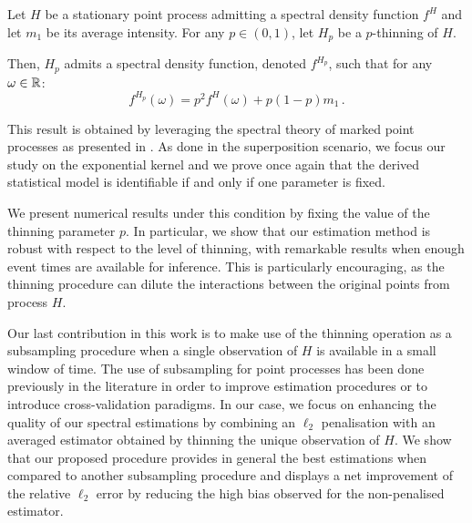     \begin{proposition}\label{prop:chap0_spectral_thinning}
      Let $H$ be a stationary point process admitting a spectral density function $f^H$ and let $m_1$ be its average intensity.
      For any $p\in(0,1)$, let $H_p$ be a $p$-thinning of $H$.
  
      Then, $H_p$ admits a spectral density function, denoted $f^{H_p}$, such that for any $\omega\in{\mathbb R}$:
      \begin{equation}\label{eq:chap0_spectral_thinning}
          f^{H_p}(\omega) = p^2 f^H(\omega) + p(1-p)m_1\,.
      \end{equation}
  
  \end{proposition}
    This result is obtained by leveraging the spectral theory of marked point processes as presented in \textcite{Bremaud2005}.
    As done in the superposition scenario, 
    we focus our study on the exponential kernel and we prove once again that the derived statistical model is identifiable if and only if one parameter is fixed.
    
    We present numerical results under this condition by fixing the value of the thinning parameter $p$. 
    In particular, we show that our estimation method is robust with respect to the level of thinning, with remarkable results when enough event times are available for inference.
    This is particularly encouraging, as the thinning procedure can dilute the interactions between the original points from process $H$.
    
    Our last contribution in this work is to make use of the thinning operation as a subsampling procedure when a single observation of $H$ is available in a small window of time.
    The use of subsampling for point processes has been done previously in the literature \parencite{Moller2003, Cronie2024, Coeurjolly2024} in order to improve estimation procedures or to introduce cross-validation paradigms.
    In our case, we focus on enhancing the quality of our spectral estimations by combining an $\ell_2$ penalisation with an averaged estimator obtained by thinning the unique observation of $H$.
    We show that our proposed procedure provides in general the best estimations when compared to another subsampling procedure and displays a net improvement of the relative $\ell_2$ error by reducing the high bias observed for the non-penalised estimator.
    
    





